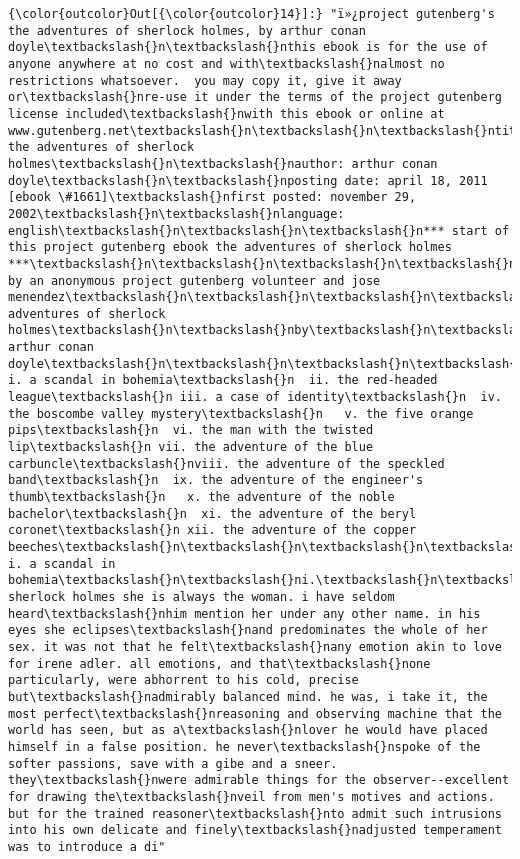 \documentclass[11pt]{article}
\begin{document}
\begin{Verbatim}[commandchars=\\\{\}]
{\color{outcolor}Out[{\color{outcolor}14}]:} "ï»¿project gutenberg's the adventures of sherlock holmes, by arthur conan doyle\textbackslash{}n\textbackslash{}nthis ebook is for the use of anyone anywhere at no cost and with\textbackslash{}nalmost no restrictions whatsoever.  you may copy it, give it away or\textbackslash{}nre-use it under the terms of the project gutenberg license included\textbackslash{}nwith this ebook or online at www.gutenberg.net\textbackslash{}n\textbackslash{}n\textbackslash{}ntitle: the adventures of sherlock holmes\textbackslash{}n\textbackslash{}nauthor: arthur conan doyle\textbackslash{}n\textbackslash{}nposting date: april 18, 2011 [ebook \#1661]\textbackslash{}nfirst posted: november 29, 2002\textbackslash{}n\textbackslash{}nlanguage: english\textbackslash{}n\textbackslash{}n\textbackslash{}n*** start of this project gutenberg ebook the adventures of sherlock holmes ***\textbackslash{}n\textbackslash{}n\textbackslash{}n\textbackslash{}n\textbackslash{}nproduced by an anonymous project gutenberg volunteer and jose menendez\textbackslash{}n\textbackslash{}n\textbackslash{}n\textbackslash{}n\textbackslash{}n\textbackslash{}n\textbackslash{}n\textbackslash{}n\textbackslash{}n\textbackslash{}nthe adventures of sherlock holmes\textbackslash{}n\textbackslash{}nby\textbackslash{}n\textbackslash{}nsir arthur conan doyle\textbackslash{}n\textbackslash{}n\textbackslash{}n\textbackslash{}n   i. a scandal in bohemia\textbackslash{}n  ii. the red-headed league\textbackslash{}n iii. a case of identity\textbackslash{}n  iv. the boscombe valley mystery\textbackslash{}n   v. the five orange pips\textbackslash{}n  vi. the man with the twisted lip\textbackslash{}n vii. the adventure of the blue carbuncle\textbackslash{}nviii. the adventure of the speckled band\textbackslash{}n  ix. the adventure of the engineer's thumb\textbackslash{}n   x. the adventure of the noble bachelor\textbackslash{}n  xi. the adventure of the beryl coronet\textbackslash{}n xii. the adventure of the copper beeches\textbackslash{}n\textbackslash{}n\textbackslash{}n\textbackslash{}n\textbackslash{}nadventure i. a scandal in bohemia\textbackslash{}n\textbackslash{}ni.\textbackslash{}n\textbackslash{}nto sherlock holmes she is always the woman. i have seldom heard\textbackslash{}nhim mention her under any other name. in his eyes she eclipses\textbackslash{}nand predominates the whole of her sex. it was not that he felt\textbackslash{}nany emotion akin to love for irene adler. all emotions, and that\textbackslash{}none particularly, were abhorrent to his cold, precise but\textbackslash{}nadmirably balanced mind. he was, i take it, the most perfect\textbackslash{}nreasoning and observing machine that the world has seen, but as a\textbackslash{}nlover he would have placed himself in a false position. he never\textbackslash{}nspoke of the softer passions, save with a gibe and a sneer. they\textbackslash{}nwere admirable things for the observer--excellent for drawing the\textbackslash{}nveil from men's motives and actions. but for the trained reasoner\textbackslash{}nto admit such intrusions into his own delicate and finely\textbackslash{}nadjusted temperament was to introduce a di"
\end{Verbatim}
            
\end{document}
